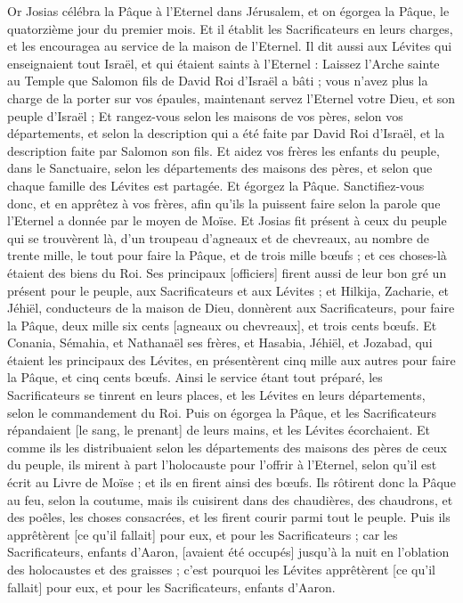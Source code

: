 \begin{multicols}{2}
\VerseOne{}Or Josias célébra la Pâque à l'Eternel dans Jérusalem, et on égorgea la Pâque, le quatorzième jour du premier mois.
Et il établit les Sacrificateurs en leurs charges, et les encouragea au service de la maison de l'Eternel.
Il dit aussi aux Lévites qui enseignaient tout Israël, et qui étaient saints à l'Eternel : Laissez l'Arche sainte au Temple que Salomon fils de David Roi d'Israël a bâti ; vous n'avez plus la charge de la porter sur vos épaules, maintenant servez l'Eternel votre Dieu, et son peuple d'Israël ;
Et rangez-vous selon les maisons de vos pères, selon vos départements, et selon la description qui a été faite par David Roi d'Israël, et la description faite par Salomon son fils.
Et aidez vos frères les enfants du peuple, dans le Sanctuaire, selon les départements des maisons des pères, et selon que chaque famille des Lévites est partagée.
Et égorgez la Pâque. Sanctifiez-vous donc, et en apprêtez à vos frères, afin qu'ils la puissent faire selon la parole que l'Eternel a donnée par le moyen de Moïse.
Et Josias fit présent à ceux du peuple qui se trouvèrent là, d'un troupeau d'agneaux et de chevreaux, au nombre de trente mille, le tout pour faire la Pâque, et de trois mille bœufs ; et ces choses-là étaient des biens du Roi.
Ses principaux [officiers] firent aussi de leur bon gré un présent pour le peuple, aux Sacrificateurs et aux Lévites ; et Hilkija, Zacharie, et Jéhiël, conducteurs de la maison de Dieu, donnèrent aux Sacrificateurs, pour faire la Pâque, deux mille six cents [agneaux ou chevreaux], et trois cents bœufs.
Et Conania, Sémahia, et Nathanaël ses frères, et Hasabia, Jéhiël, et Jozabad, qui étaient les principaux des Lévites, en présentèrent cinq mille aux autres pour faire la Pâque, et cinq cents bœufs.
Ainsi le service étant tout préparé, les Sacrificateurs se tinrent en leurs places, et les Lévites en leurs départements, selon le commandement du Roi.
Puis on égorgea la Pâque, et les Sacrificateurs répandaient [le sang, le prenant] de leurs mains, et les Lévites écorchaient.
Et comme ils les distribuaient selon les départements des maisons des pères de ceux du peuple, ils mirent à part l'holocauste pour l'offrir à l'Eternel, selon qu'il est écrit au Livre de Moïse ; et ils en firent ainsi des bœufs.
Ils rôtirent donc la Pâque au feu, selon la coutume, mais ils cuisirent dans des chaudières, des chaudrons, et des poêles, les choses consacrées, et les firent courir parmi tout le peuple.
Puis ils apprêtèrent [ce qu'il fallait] pour eux, et pour les Sacrificateurs ; car les Sacrificateurs, enfants d'Aaron, [avaient été occupés] jusqu'à la nuit en l'oblation des holocaustes et des graisses ; c'est pourquoi les Lévites apprêtèrent [ce qu'il fallait] pour eux, et pour les Sacrificateurs, enfants d'Aaron.

\end{multicols}
